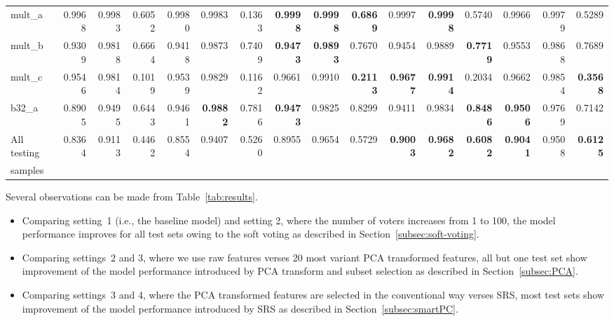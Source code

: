 \documentclass[10pt, final, letter, twocolumns]{IEEEtran}
\begin{document}
\begin{table}
\begin{tabular}{l|rrr|rrr|rrr|rrr||rrr}
mult\_a & 0.9968&       0.9983  &0.6052 &0.9980 &0.9983 &0.1363 &{\bf 0.9998}   &{\bf 0.9998} &{\bf 0.6869}   &0.9997 &{\bf 0.9998}   &0.5740 & 0.9966        &0.9979&        0.5289\\
mult\_b &0.9309 &0.9818 &0.6664 &0.9418 &0.9873 &0.7409 &{\bf 0.9473}   &{\bf 0.9893} &0.7670 &0.9454 &0.9889 &{\bf 0.7719} & 0.9553        &0.9868 &0.7689\\
mult\_c & 0.9546        &0.9814&        0.1019& 0.9539& 0.9829& 0.1162& 0.9661& 0.9910&{\bf         0.2113}&        {\bf 0.9677} &  {\bf 0.9914} &  0.2034 & 0.9662        &0.9854 & {\bf 0.3568}\\
b32\_a & 0.8905 &  0.9495 &        0.6443 &        0.9461 &        {\bf 0.9882} &       0.7816 &        {\bf 0.9473} &  0.9825 &        0.8299 &        0.9411 &       0.9834  & {\bf 0.8486} & {\bf 0.9506} &    0.9769 &        0.7142\\
\midrule
All testing & \multirow{2}{*}{0.8364}   & \multirow{2}{*}{0.9113} &     \multirow{2}{*}{0.4462} &       \multirow{2}{*}{0.8554} &       \multirow{2}{*}{0.9407} & \multirow{2}{*}{0.5260} &       \multirow{2}{*}{0.8955} &       \multirow{2}{*}{0.9654} &       \multirow{2}{*}{0.5729} &       \multirow{2}{*}{\bf 0.9003} &   \multirow{2}{*}{\bf 0.9682} &   \multirow{2}{*}{\bf 0.6082} & \multirow{2}{*}{\bf 0.9041} & \multirow{2}{*}{0.9508} &  \multirow{2}{*}{\bf 0.6125}\\
samples &  &&&&&&&&&&&&&&\\
\bottomrule
\end{tabular}\vspace{-7mm}
\end{table}

Several observations can be made from Table~\ref{tab:results}.
\begin{itemize}\vspace{-1mm}
\item Comparing setting~1 (i.e., the baseline model) and setting 2, where the number of voters increases from 1 to 100, the model performance improves for all test sets owing to the soft voting as described in Section~\ref{subsec:soft-voting}.
\item Comparing settings~2 and 3, where we use raw features verses 20 most variant PCA transformed features, all but one test set show improvement of the model performance introduced by PCA transform and subset selection as described in Section~\ref{subsec:PCA}.
\item Comparing settings~3 and 4, where the PCA transformed features are selected in the conventional way verses SRS, most test sets show improvement of the model performance introduced by SRS as described in Section~\ref{subsec:smartPC}.
\end{itemize}
\vspace{-1mm}
\end{document}

